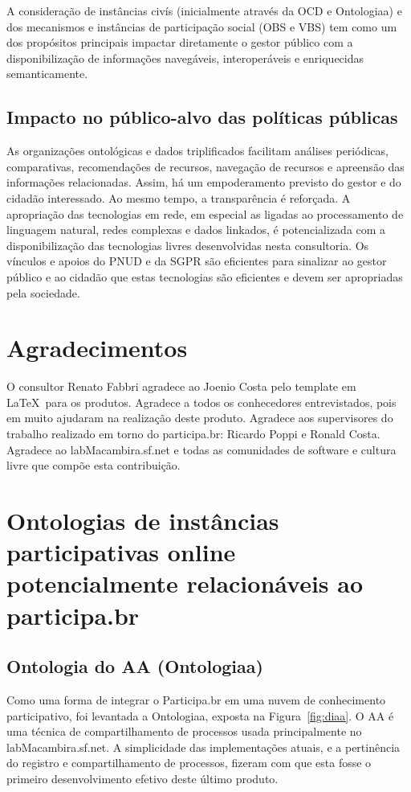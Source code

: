 \documentclass[12pt]{article}
\begin{document}
A consideração de instâncias civís (inicialmente através da OCD e Ontologiaa) e dos mecanismos e instâncias de participação social (OBS e VBS) tem como um dos propósitos principais impactar diretamente o gestor público com a disponibilização de informações navegáveis, interoperáveis e enriquecidas semanticamente.

\subsection{Impacto no público-alvo das políticas públicas}
As organizações ontológicas e dados triplificados facilitam análises periódicas, comparativas, recomendações de recursos, navegação de recursos e apreensão das informações relacionadas. Assim, há um empoderamento previsto do gestor e do cidadão interessado. Ao mesmo tempo, a transparência é reforçada. A apropriação das tecnologias em rede, em especial as ligadas ao processamento de linguagem natural, redes complexas e dados linkados, é potencializada com a disponibilização das tecnologias livres desenvolvidas nesta consultoria. Os vínculos e apoios do PNUD e da SGPR são eficientes para sinalizar ao gestor público e ao cidadão que estas tecnologias são eficientes e devem ser apropriadas pela sociedade.


\section{Agradecimentos}
O consultor Renato Fabbri agradece ao Joenio Costa pelo template em \LaTeX\ para os produtos. Agradece a todos os conhecedores entrevistados, pois em muito ajudaram na realização deste produto. Agradece aos supervisores do trabalho realizado em torno do participa.br: Ricardo Poppi e Ronald Costa. Agradece ao labMacambira.sf.net e todas as comunidades de software e cultura livre que compõe esta contribuição.
\newpage

\newpage

\newpage
\printindex
\newpage
%
\appendix
\section{Ontologias de instâncias participativas online potencialmente relacionáveis ao participa.br}
\subsection{Ontologia do AA (Ontologiaa)}\label{ap:aa}
Como uma forma de integrar o Participa.br em uma nuvem de conhecimento participativo, foi levantada a Ontologiaa, exposta na Figura~\ref{fig:diaa}. O AA é uma técnica de compartilhamento de processos usada principalmente no labMacambira.sf.net. A simplicidade das implementações atuais, e a pertinência do registro e compartilhamento de processos, fizeram com que esta fosse o primeiro desenvolvimento efetivo deste último produto.
\end{document}
